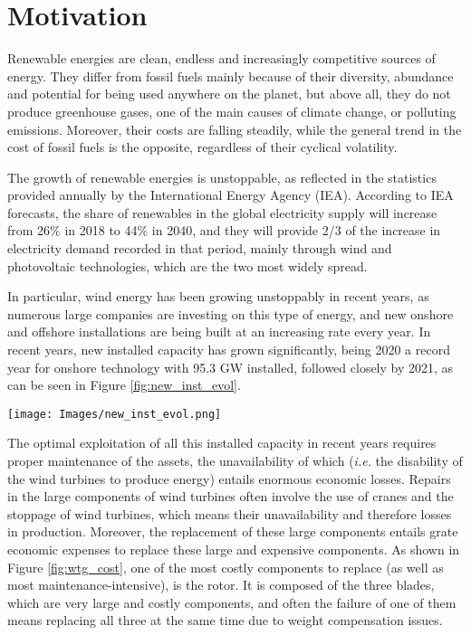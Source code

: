 
\label{chapter:introduction}

\section{Motivation}
\label{sec:motivation}
Renewable energies are clean, endless and increasingly competitive sources of energy. They differ from fossil fuels mainly because of their diversity, abundance and potential for being used anywhere on the planet, but above all, they do not produce greenhouse gases, one of the main causes of climate change, or polluting emissions. Moreover, their costs are falling steadily, while the general trend in the cost of fossil fuels is the opposite, regardless of their cyclical volatility.

The growth of renewable energies is unstoppable, as reflected in the statistics provided annually by the International Energy Agency (IEA). According to IEA forecasts, the share of renewables in the global electricity supply will increase from 26\% in 2018 to 44\% in 2040, and they will provide 2/3 of the increase in electricity demand recorded in that period, mainly through wind and photovoltaic technologies, which are the two most widely spread. 

In particular, wind energy has been growing unstoppably in recent years, as numerous large companies are investing on this type of energy, and new onshore and offshore installations are being built at an increasing rate every year. In recent years, new installed capacity has grown significantly, being 2020 a record year for onshore technology with 95.3 GW installed, followed closely by 2021, as can be seen in Figure \ref{fig:new_inst_evol}.

\begin{figure*}[htbp]
        \centering            
        \texttt{[image: Images/new\_inst\_evol.png]}
        \caption[New wind power capacity installed globally by year \cite{windrepor2022}.]
        {\small New wind power capacity installed globally by year \cite{windrepor2022}.} 
        \label{fig:new_inst_evol}
    \end{figure*}

The optimal exploitation of all this installed capacity in recent years requires proper maintenance of the assets, the unavailability of which (\emph{i.e.} the disability of the wind turbines to produce energy) entails enormous economic losses. Repairs in the large components of wind turbines often involve the use of cranes and the stoppage of wind turbines, which means their unavailability and therefore losses in production. Moreover, the replacement of these large components entails grate economic expenses to replace these large and expensive components. As shown in Figure \ref{fig:wtg_cost}, one of the most costly components to replace (as well as most maintenance-intensive), is the rotor. It is composed of the three blades, which are very large and costly components, and often the failure of one of them means replacing all three at the same time due to weight compensation issues.

